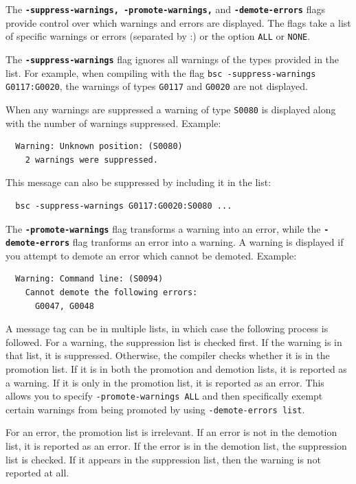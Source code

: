 \documentclass{article}
\newcommand{\te}[1]{\texttt{#1}}
\begin{document}
The {\bf\tt -suppress-warnings, -promote-warnings,} and {\bf\tt -demote-errors} flags provide control over which
warnings and errors are displayed.  The flags take a list of specific  warnings
or errors  (separated by :) or  the option
\te{ALL} or \te{NONE}.

The {\bf\tt -suppress-warnings} flag
ignores all warnings of the types provided in the list.  
For example, when compiling with the flag \te{bsc -suppress-warnings
G0117:G0020},  the warnings  of types \te{G0117} and \te{G0020} 
are not  displayed.  

When any warnings are suppressed a warning of type \te{S0080} is
displayed along with the number of warnings suppressed.  Example:

\begin{verbatim}
  Warning: Unknown position: (S0080)
    2 warnings were suppressed.
\end{verbatim}

This message can also be suppressed by including it in the list:

\begin{verbatim}
  bsc -suppress-warnings G0117:G0020:S0080 ...
\end{verbatim}

The {\bf\tt -promote-warnings} flag transforms a warning into an
error, while the {\bf\tt -demote-errors} flag tranforms an error into
a warning.   A warning is displayed if you attempt to demote an error
which cannot be demoted.  Example:

\begin{verbatim}
  Warning: Command line: (S0094)
    Cannot demote the following errors:
      G0047, G0048 
\end{verbatim}

A message tag can be in multiple lists, in which case the following
process is followed.  For a warning, the suppression list is checked
first.  If the warning is in that list, it is suppressed.  Otherwise,
the compiler checks whether it is in the promotion list.  If it
is in both the promotion and demotion lists, it is reported as a
warning.  If it is only in the promotion list, it is reported as an
error.  This allows you to specify \te{-promote-warnings ALL} and then
specifically exempt certain warnings from being promoted by using
\te{-demote-errors list}.

For an error, the promotion list is irrelevant.  If an error is not in
the demotion list, it is reported as an error.  If the error is in the
demotion list, the suppression list is checked.  If it appears in the
suppression list, then the warning is not reported at all.
\end{document}
